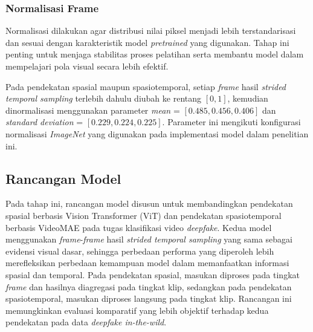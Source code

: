 \subsubsection{Normalisasi Frame}
Normalisasi dilakukan agar distribusi nilai piksel menjadi lebih terstandarisasi dan sesuai dengan karakteristik model \textit{pretrained} yang digunakan. Tahap ini penting untuk menjaga stabilitas proses pelatihan serta membantu model dalam mempelajari pola visual secara lebih efektif. \par

Pada pendekatan spasial maupun spasiotemporal, setiap \textit{frame} hasil \textit{strided temporal sampling} terlebih dahulu diubah ke rentang $[0, 1]$, kemudian dinormalisasi menggunakan parameter \textit{mean} = $[0.485, 0.456, 0.406]$ dan \textit{standard deviation} = $[0.229, 0.224, 0.225]$. Parameter ini mengikuti konfigurasi normalisasi \textit{ImageNet} yang digunakan pada implementasi model dalam penelitian ini. \par

\subsection{Rancangan Model}
Pada tahap ini, rancangan model disusun untuk membandingkan pendekatan spasial berbasis Vision Transformer (ViT) dan pendekatan spasiotemporal berbasis VideoMAE pada tugas klasifikasi video \textit{deepfake}. Kedua model menggunakan \textit{frame}-\textit{frame} hasil \textit{strided temporal sampling} yang sama sebagai evidensi visual dasar, sehingga perbedaan performa yang diperoleh lebih merefleksikan perbedaan kemampuan model dalam memanfaatkan informasi spasial dan temporal. Pada pendekatan spasial, masukan diproses pada tingkat \textit{frame} dan hasilnya diagregasi pada tingkat klip, sedangkan pada pendekatan spasiotemporal, masukan diproses langsung pada tingkat klip. Rancangan ini memungkinkan evaluasi komparatif yang lebih objektif terhadap kedua pendekatan pada data \textit{deepfake in-the-wild}. \par

